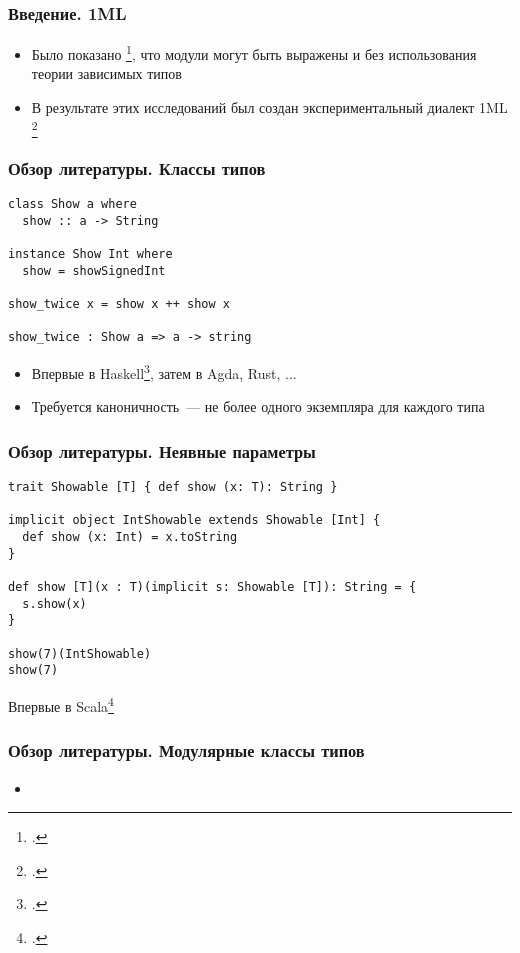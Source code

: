 \documentclass{beamer}
\begin{document}
\begin{frame}\frametitle{Введение. 1ML}
\begin{itemize}
  \item Было показано \footcite{fing}, что модули могут быть выражены и без использования теории зависимых типов
  \item В результате этих исследований был создан экспериментальный диалект 1ML \footcite{1ml}
\end{itemize}
\end{frame}

\lstset{language=haskell}
\begin{frame}[fragile]\frametitle{Обзор литературы. Классы типов}
\begin{lstlisting}
class Show a where
  show :: a -> String

instance Show Int where
  show = showSignedInt

show_twice x = show x ++ show x

show_twice : Show a => a -> string
\end{lstlisting}
\begin{itemize}
  \item Впервые в Haskell\footcite{adhoc}, затем в Agda, Rust, ...
  \item Требуется каноничность~--- не более одного экземпляра для каждого типа
\end{itemize}
\end{frame}

\lstset{language=scala}
\begin{frame}[fragile]\frametitle{Обзор литературы. Неявные параметры}
\begin{lstlisting}
trait Showable [T] { def show (x: T): String }

implicit object IntShowable extends Showable [Int] {
  def show (x: Int) = x.toString
}

def show [T](x : T)(implicit s: Showable [T]): String = {
  s.show(x)
}

show(7)(IntShowable)
show(7)
\end{lstlisting}
Впервые в Scala\footcite{implicits}
\end{frame}

\begin{frame}\frametitle{Обзор литературы. Модулярные классы типов}
\begin{itemize}
  \item 
\end{itemize}
\end{frame}
\end{document}
